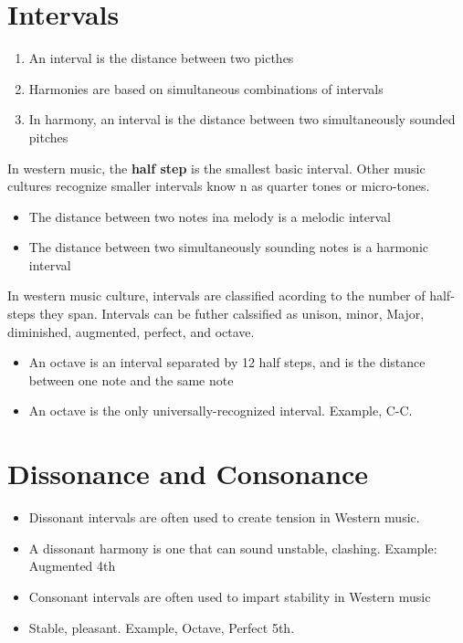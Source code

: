 \documentclass[12pt, a4paper]{report}
\begin{document}
  \section{Intervals}
  \begin{enumerate}
    \item An interval is the distance between two picthes
    \item Harmonies are based on simultaneous combinations of intervals
    \item In harmony, an interval is the distance between two simultaneously sounded pitches
  \end{enumerate}

  In western music, the \textbf{half step} is the smallest basic interval. Other music cultures recognize smaller intervals know n as quarter tones or micro-tones.

  \begin{itemize}
    \item The distance between two notes ina melody is a melodic interval
    \item The distance between two simultaneously sounding notes is a harmonic interval
  \end{itemize}

  In western music culture, intervals are classified acording to the number of half-steps they span. Intervals can be futher calssified as unison, minor, Major, diminished, augmented, perfect, and octave.

  \begin{itemize}
    \item An octave is an interval separated by 12 half steps, and is the distance between one note and the same note
    \item An octave is the only universally-recognized interval. Example, C-C.
  \end{itemize}

  \section{Dissonance and Consonance}

  \begin{itemize}
    \item Dissonant intervals are often used to create tension in Western music.
    \item A dissonant harmony is one that can sound unstable, clashing. Example: Augmented 4th
    \item Consonant intervals are often used to impart stability in Western music
    \item Stable, pleasant. Example, Octave, Perfect 5th.
  \end{itemize}
\end{document}
